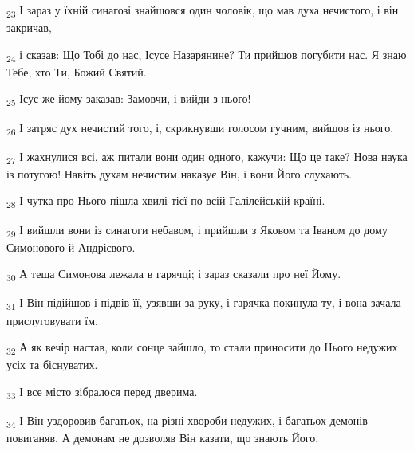 \begin{tcolorbox}
\textsubscript{23} І зараз у їхній синагозі знайшовся один чоловік, що мав духа нечистого, і він закричав,
\end{tcolorbox}
\begin{tcolorbox}
\textsubscript{24} і сказав: Що Тобі до нас, Ісусе Назарянине? Ти прийшов погубити нас. Я знаю Тебе, хто Ти, Божий Святий.
\end{tcolorbox}
\begin{tcolorbox}
\textsubscript{25} Ісус же йому заказав: Замовчи, і вийди з нього!
\end{tcolorbox}
\begin{tcolorbox}
\textsubscript{26} І затряс дух нечистий того, і, скрикнувши голосом гучним, вийшов із нього.
\end{tcolorbox}
\begin{tcolorbox}
\textsubscript{27} І жахнулися всі, аж питали вони один одного, кажучи: Що це таке? Нова наука із потугою! Навіть духам нечистим наказує Він, і вони Його слухають.
\end{tcolorbox}
\begin{tcolorbox}
\textsubscript{28} І чутка про Нього пішла хвилі тієї по всій Галілейській країні.
\end{tcolorbox}
\begin{tcolorbox}
\textsubscript{29} І вийшли вони із синагоги небавом, і прийшли з Яковом та Іваном до дому Симонового й Андрієвого.
\end{tcolorbox}
\begin{tcolorbox}
\textsubscript{30} А теща Симонова лежала в гарячці; і зараз сказали про неї Йому.
\end{tcolorbox}
\begin{tcolorbox}
\textsubscript{31} І Він підійшов і підвів її, узявши за руку, і гарячка покинула ту, і вона зачала прислуговувати їм.
\end{tcolorbox}
\begin{tcolorbox}
\textsubscript{32} А як вечір настав, коли сонце зайшло, то стали приносити до Нього недужих усіх та біснуватих.
\end{tcolorbox}
\begin{tcolorbox}
\textsubscript{33} І все місто зібралося перед дверима.
\end{tcolorbox}
\begin{tcolorbox}
\textsubscript{34} І Він уздоровив багатьох, на різні хвороби недужих, і багатьох демонів повиганяв. А демонам не дозволяв Він казати, що знають Його.
\end{tcolorbox}
